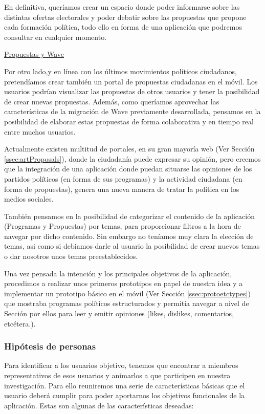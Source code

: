 En definitiva, queríamos crear un espacio donde poder informarse sobre las distintas ofertas electorales y poder debatir sobre las propuestas que propone cada formación política, todo ello en forma de una aplicación que podremos consultar en cualquier momento. 

\underline{Propuestas y Wave}

Por otro lado,y en línea con los últimos movimientos políticos ciudadanos, pretendíamos crear también un portal de propuestas ciudadanas en el móvil. Los usuarios podrían visualizar las propuestas de otros usuarios y tener la posibilidad de crear nuevas propuestas. Además, como queríamos aprovechar las características de la migración de Wave previamente desarrollada, pensamos en la posibilidad de elaborar estas propuestas de forma colaborativa y en tiempo real entre muchos usuarios.

Actualmente existen multitud de portales, en su gran mayoría web (Ver Sección \ref{ssec:artProposals}), donde la ciudadanía puede expresar su opinión, pero creemos que la integración de una aplicación donde puedan situarse las opiniones de los partidos políticos (en forma de sus programas) y la actividad ciudadana (en forma de propuestas), genera una nueva manera de tratar la política en los medios sociales.

También pensamos en la posibilidad de categorizar el contenido de la aplicación (Programas y Propuestas) por temas, para proporcionar filtros a la hora de navegar por dicho contenido. Sin embargo no teníamos muy clara la elección de temas, asi como si debiamos darle al usuario la posibilidad de crear nuevos temas o dar nosotros unos temas preestablecidos.
 
Una vez pensada la intención y los principales objetivos de la aplicación, procedimos a realizar unos primeros prototipos en papel de nuestra idea y a implementar un prototipo básico en el móvil (Ver Sección \ref{ssec:protoetctypes}) que mostraba programas políticos estructurados y permitía navegar a nivel de Sección por ellos para leer y emitir opiniones (likes, dislikes, comentarios, etcétera.).  

\subsubsection{Hipótesis de personas}

Para identificar a los usuarios objetivo, tenemos que encontrar a miembros representativos de esos usuarios y animarlos a que participen en nuestra investigación. Para ello reuniremos una serie de características básicas que el usuario deberá cumplir para poder aportarnos los objetivos funcionales de la aplicación. Estas son algunas de las características deseadas:

